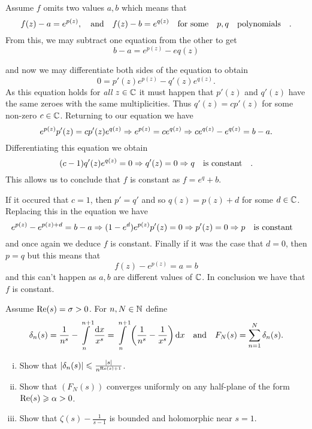 \documentclass[12pt]{memoir}
\begin{document}
\begin{ptcbr}
Assume $f$ omits two values $a,b$ which means that 
$$f(z)-a=e^{p(z)},\quad\text{and}\quad f(z)-b=e^{q(z)}\quad\text{for some}\quad p,q\quad\text{polynomials}\quad.$$
From this, we may subtract one equation from the other to get 
$$b-a=e^{p(z)}-e{q(z)}$$
\iffalse
and now taking the limit as $z\to\infty$ on both sides we see that 
$$\lim_{z\to\infty}(e^{p(z)}-e{q(z)})=b-a$$
is finite limit. 
\fi
and now we may differentiate both sides of the equation to obtain 
$$0=p'(z)e^{p(z)}-q'(z)e^{q(z)}.$$
As this equation holds for \emph{all} $z\in\mathbb{C}$ it must happen that $p'(z)$ and $q'(z)$ have the same zeroes with the same multiplicities. Thus $q'(z)=cp'(z)$ for some non-zero $c\in\mathbb{C}$. Returning to our equation we have 
$$e^{p(z)}p'(z)=cp'(z)e^{q(z)}\Rightarrow e^{p(z)}=ce^{q(z)}\Rightarrow ce^{q(z)}-e^{q(z)}=b-a.$$
Differentiating this equation we obtain 
$$(c-1)q'(z)e^{q(z)}=0\Rightarrow q'(z)=0\Rightarrow q\quad\text{is constant}\quad.$$
This allows us to conclude that $f$ is constant as $f=e^q+b$.\par 
If it occured that $c=1$, then $p'=q'$ and so $q(z)=p(z)+d$ for some $d\in\mathbb{C}$. Replacing this in the equation we have 
$$e^{p(z)}-e^{p(z)+d}=b-a\Rightarrow(1-e^d)e^{p(z)}p'(z)=0\Rightarrow p'(z)=0\Rightarrow p\quad\text{is constant}\quad$$
and once again we deduce $f$ is constant. Finally if it was the case that $d=0$, then $p=q$ but this means that 
$$f(z)-e^{p(z)}=a=b$$ 
and this can't happen as $a,b$ are different values of $\mathbb{C}$. In conclusion we have that $f$ is constant.
   \end{ptcbr}

\begin{Ej}
   Assume $\Re(s)=\sigma>0$. For $n,N\in\mathbb{N}$ define 
   $$\delta_n(s)=\frac{1}{n^s}-\int\limits_n^{n+1}\frac{\dd x}{x^s}=\int\limits_n^{n+1}\left(\frac{1}{n^s}-\frac{1}{x^s}\right)\dd x\quad\text{and}\quad F_N(s)=\sum_{n=1}^{N}\delta_n(s).$$
   \begin{enumerate}[i)]
      \itemsep=-0.4em
      \item Show that $|\delta_n(s)|\leqslant\frac{|s|}{n^{\Re(s)+1}}$. 
      \item Show that $(F_N(s))$ converges uniformly on any half-plane of the form $\Re(s)\geqslant \alpha>0$.
      \item Show that $\zeta(s)-\frac{1}{s-1}$ is bounded and holomorphic near $s=1$. 
   \end{enumerate}
   
\end{Ej}
\end{document}
